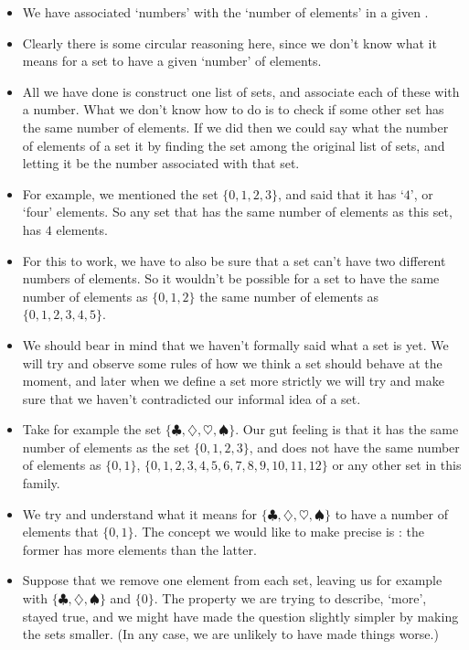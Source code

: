 \begin{itemize}
\item
We have associated `numbers' with the `number of elements' in a given .
\item
Clearly there is some circular reasoning here, since we don't know what it means for a set to have a given `number' of elements.
\item
All we have done is construct one list of sets, and associate each of these with a number. What we don't know how to do is to check if some other set has the same number of elements. If we did then we could say what the number of elements of a set it by finding the set among the original list of sets, and letting it be the number associated with that set.
\item
For example, we mentioned the set $\{0,1,2,3\}$, and said that it has `$4$', or `four' elements. So any set that has the same number of elements as this set, has $4$ elements.
\item
For this to work, we have to also be sure that a set can't have two different numbers of elements. So it wouldn't be possible for a set to have the same number of elements as $\{0,1,2\}$  the same number of elements as $\{0,1,2,3,4,5\}$.
\item
We should bear in mind that we haven't formally said what a set is yet. We will try and observe some rules of how we think a set should behave at the moment, and later when we define a set more strictly we will try and make sure that we haven't contradicted our informal idea of a set.
\item
Take for example the set $\{\clubsuit, \diamondsuit, \heartsuit, \spadesuit\}$.
Our gut feeling is that it has the same number of elements as the set $\{0,1,2,3\}$, and does not have the same number of elements as $\{0,1\}$, $\{0,1,2,3,4,5,6,7,8,9,10,11,12\}$ or any other set in this family.
\item
We try and understand what it means for $\{\clubsuit, \diamondsuit, \heartsuit, \spadesuit\}$ to have a  number of elements that $\{0,1\}$. The concept we would like to make precise is : the former has more elements than the latter.
\item
Suppose that we remove one element from each set, leaving us for example with $\{\clubsuit, \diamondsuit, \spadesuit\}$ and $\{0\}$. The property we are trying to describe, `more', stayed true, and we might have made the question slightly simpler by making the sets smaller. (In any case, we are unlikely to have made things worse.)

\end{itemize}
